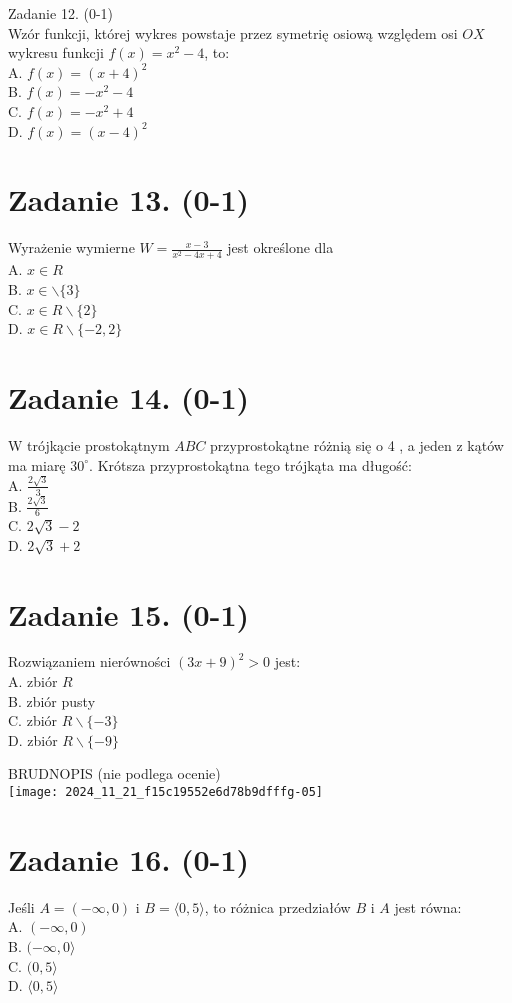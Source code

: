 \documentclass[10pt]{article}
\begin{document}
Zadanie 12. (0-1)\\
Wzór funkcji, której wykres powstaje przez symetrię osiową względem osi \(O X\) wykresu funkcji \(f(x)=x^{2}-4\), to:\\
A. \(f(x)=(x+4)^{2}\)\\
B. \(f(x)=-x^{2}-4\)\\
C. \(f(x)=-x^{2}+4\)\\
D. \(f(x)=(x-4)^{2}\)

\section*{Zadanie 13. (0-1)}
Wyrażenie wymierne \(W=\frac{x-3}{x^{2}-4 x+4}\) jest określone dla\\
A. \(x \in R\)\\
B. \(x \in \backslash\{3\}\)\\
C. \(x \in R \backslash\{2\}\)\\
D. \(x \in R \backslash\{-2,2\}\)

\section*{Zadanie 14. (0-1)}
W trójkącie prostokątnym \(A B C\) przyprostokątne różnią się o 4 , a jeden z kątów ma miarę \(30^{\circ}\). Krótsza przyprostokątna tego trójkąta ma długość:\\
A. \(\frac{2 \sqrt{3}}{3}\)\\
B. \(\frac{2 \sqrt{3}}{6}\)\\
C. \(2 \sqrt{3}-2\)\\
D. \(2 \sqrt{3}+2\)

\section*{Zadanie 15. (0-1)}
Rozwiązaniem nierówności \((3 x+9)^{2}>0\) jest:\\
A. zbiór \(R\)\\
B. zbiór pusty\\
C. zbiór \(R \backslash\{-3\}\)\\
D. zbiór \(R \backslash\{-9\}\)

BRUDNOPIS (nie podlega ocenie)\\
\texttt{[image: 2024\_11\_21\_f15c19552e6d78b9dfffg-05]}

\section*{Zadanie 16. (0-1)}
Jeśli \(A=(-\infty, 0)\) i \(B=\langle 0,5\rangle\), to różnica przedziałów \(B\) i \(A\) jest równa:\\
A. \((-\infty, 0)\)\\
B. \((-\infty, 0\rangle\)\\
C. \((0,5\rangle\)\\
D. \(\langle 0,5\rangle\)
\end{document}
